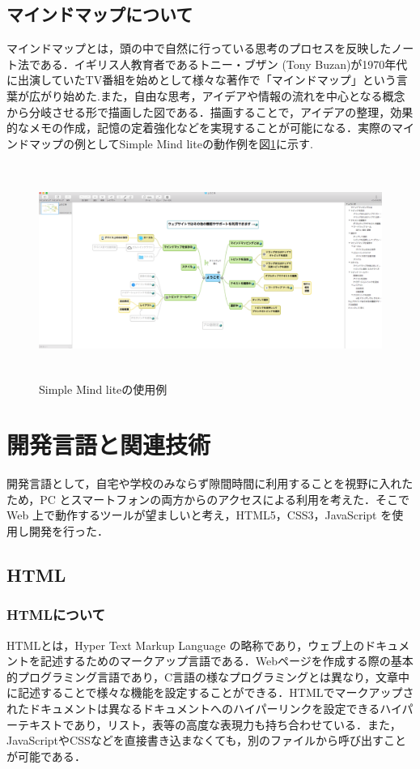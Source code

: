\documentclass[a4j,12pt]{jarticle}
\begin{document}
\subsection{マインドマップについて}
マインドマップとは，頭の中で自然に行っている思考のプロセスを反映したノート法である．イギリス人教育者であるトニー・ブザン (Tony Buzan)が1970年代に出演していたTV番組を始めとして様々な著作で「マインドマップ」という言葉が広がり始めた\cite{ren4}.また，自由な思考，アイデアや情報の流れを中心となる概念から分岐させる形で描画した図である．描画することで，アイデアの整理，効果的なメモの作成，記憶の定着強化などを実現することが可能になる．実際のマインドマップの例としてSimple Mind liteの動作例を図\ref{fig:e}に示す.
\begin{figure}[h]
\begin{center}
 \includegraphics[width=160mm,height=70mm]{figure/maindmap.png}
\end{center}
 \caption{Simple Mind liteの使用例}
 \label{fig:e}
\end{figure}
\newpage

\newpage
\section{開発言語と関連技術}
開発言語として，自宅や学校のみならず隙間時間に利用することを視野に入れたため，PC とスマートフォンの両方からのアクセスによる利用を考えた．そこで Web 上で動作するツールが望ましいと考え，HTML5，CSS3，JavaScript を使用し開発を行った．
\subsection{HTML}
\subsubsection{HTMLについて}
HTMLとは，Hyper Text Markup Language の略称であり，ウェブ上のドキュメントを記述するためのマークアップ言語である．Webページを作成する際の基本的プログラミング言語であり，C言語の様なプログラミングとは異なり，文章中に記述することで様々な機能を設定することができる．HTMLでマークアップされたドキュメントは異なるドキュメントへのハイパーリンクを設定できるハイパーテキストであり，リスト，表等の高度な表現力も持ち合わせている．また，JavaScriptやCSSなどを直接書き込まなくても，別のファイルから呼び出すことが可能である\cite{ren8}．
\end{document}
